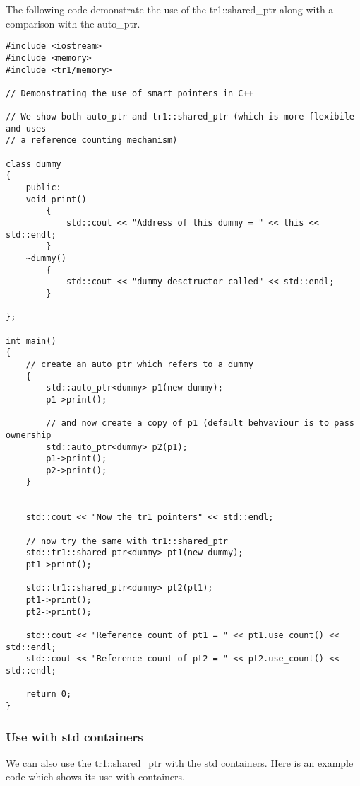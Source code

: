 The following code demonstrate the use of the tr1::shared\_ptr along
with a comparison with the auto\_ptr.
\begin{lstlisting}
#include <iostream>
#include <memory>
#include <tr1/memory>

// Demonstrating the use of smart pointers in C++

// We show both auto_ptr and tr1::shared_ptr (which is more flexibile and uses
// a reference counting mechanism)

class dummy
{
	public:
	void print()
		{
			std::cout << "Address of this dummy = " << this << std::endl;
		}
	~dummy()
		{
			std::cout << "dummy desctructor called" << std::endl;
		}
	
};

int main()
{
	// create an auto ptr which refers to a dummy
	{
		std::auto_ptr<dummy> p1(new dummy);
		p1->print();
		
		// and now create a copy of p1 (default behvaviour is to pass ownership
		std::auto_ptr<dummy> p2(p1);
		p1->print();
		p2->print();
	}
	

	std::cout << "Now the tr1 pointers" << std::endl;
	
	// now try the same with tr1::shared_ptr
	std::tr1::shared_ptr<dummy> pt1(new dummy);
	pt1->print();

	std::tr1::shared_ptr<dummy> pt2(pt1);
	pt1->print();
	pt2->print();
	
	std::cout << "Reference count of pt1 = " << pt1.use_count() << std::endl;
	std::cout << "Reference count of pt2 = " << pt2.use_count() << std::endl;
	
	return 0;
}  
\end{lstlisting}

\subsubsection{Use with std containers}
\label{sec:use-with-std}

We can also use the tr1::shared\_ptr with the std containers. Here is
an example code which shows its use with containers.

